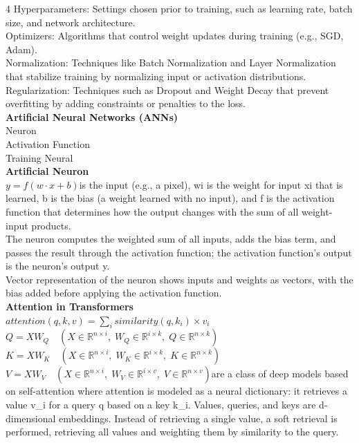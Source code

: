 \documentclass[8pt]{extarticle}
\begin{document}
\begin{multicols}{4}
Hyperparameters: Settings chosen prior to training, such as learning rate, batch size, and network architecture.\\
Optimizers: Algorithms that control weight updates during training (e.g., SGD, Adam).\\
Normalization: Techniques like Batch Normalization and Layer Normalization that stabilize training by normalizing input or activation distributions.\\
Regularization: Techniques such as Dropout and Weight Decay that prevent overfitting by adding constraints or penalties to the loss.\\
\vspace{2pt}\textbf{Artificial Neural Networks (ANNs)}\\
Neuron\\
Activation Function\\
Training Neural\\
\vspace{2pt}\textbf{Artificial Neuron}\\
$y = f(w \cdot x + b)$\xi is the input (e.g., a pixel), wi is the weight for input xi that is learned, b is the bias (a weight learned with no input), and f is the activation function that determines how the output changes with the sum of all weight-input products.\\
The neuron computes the weighted sum of all inputs, adds the bias term, and passes the result through the activation function; the activation function's output is the neuron's output y.\\
Vector representation of the neuron shows inputs and weights as vectors, with the bias added before applying the activation function.\\
\vspace{2pt}\textbf{Attention in Transformers}\\
$attention(q, k, v) = \sum_i similarity(q, k_i) \times v_i$\\
$Q = X W_Q \quad (X \in \mathbb{R}^{n\times i},\; W_Q \in \mathbb{R}^{i\times k},\; Q \in \mathbb{R}^{n\times k})$\\
$K = X W_K \quad (X \in \mathbb{R}^{n\times i},\; W_K \in \mathbb{R}^{i\times k},\; K \in \mathbb{R}^{n\times k})$\\
$V = X W_V \quad (X \in \mathbb{R}^{n\times i},\; W_V \in \mathbb{R}^{i\times v},\; V \in \mathbb{R}^{n\times v})$\Transformers are a class of deep models based on self-attention where attention is modeled as a neural dictionary: it retrieves a value v\_i for a query q based on a key k\_i. Values, queries, and keys are d-dimensional embeddings. Instead of retrieving a single value, a soft retrieval is performed, retrieving all values and weighting them by similarity to the query.\\

\end{multicols}
\end{document}
